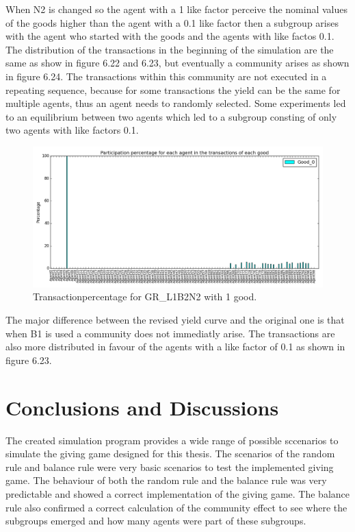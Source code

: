 \documentclass[twoside,openright]{uva-bachelor-thesis}
\begin{document}
\begin{description}
When N2 is changed so the agent with a 1 like factor perceive the nominal values of the goods higher than the agent with a 0.1 like factor then a subgroup arises with the agent who started with the goods and the agents with like factos 0.1. The distribution of the transactions in the beginning of the simulation are the same as show in figure 6.22 and 6.23, but eventually a community arises as shown in figure 6.24. The transactions within this community are not executed in a repeating sequence, because for some transactions the yield can be the same for multiple agents, thus an agent needs to randomly selected. Some experiments  led to an equilibrium  between two agents which led to a subgroup consting of only two agents with like factors 0.1.
\begin{figure}[h!]
  \centering
\includegraphics[scale=0.4]{Simulation2_figures/GR_L1B2N2_321_4k} 
  \caption{Transactionpercentage for GR\_L1B2N2 with 1 good.}
\end{figure}

\end{description}

The major difference between the revised yield curve and the original one is that when B1 is used a community does not immediatly arise. The transactions are also more distributed in favour of the agents with a like factor of 0.1 as shown in figure  6.23. 










\chapter{Conclusions and Discussions}
The created simulation program provides a wide range of possible sccenarios to simulate the giving game designed for this thesis. The scenarios of the random rule and balance rule were very basic scenarios to test the implemented giving game. The behaviour of both the random rule and the balance rule was very predictable and showed a correct implementation of the giving game. The balance rule also confirmed a correct calculation of the community effect to see where the subgroups emerged and how many agents were part of these subgroups.
\end{document}
